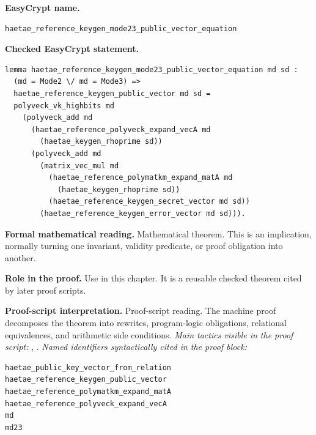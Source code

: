 \begin{formaltheorem}
\noindent\textbf{EasyCrypt name.}
\begin{lstlisting}[language=EasyCrypt,basicstyle=\ttfamily\scriptsize]
haetae_reference_keygen_mode23_public_vector_equation
\end{lstlisting}
\noindent\textbf{Checked EasyCrypt statement.}
\begin{lstlisting}[language=EasyCrypt,basicstyle=\ttfamily\scriptsize]
lemma haetae_reference_keygen_mode23_public_vector_equation md sd :
  (md = Mode2 \/ md = Mode3) =>
  haetae_reference_keygen_public_vector md sd =
  polyveck_vk_highbits md
    (polyveck_add md
      (haetae_reference_polyveck_expand_vecA md
        (haetae_keygen_rhoprime sd))
      (polyveck_add md
        (matrix_vec_mul md
          (haetae_reference_polymatkm_expand_matA md
            (haetae_keygen_rhoprime sd))
          (haetae_reference_keygen_secret_vector md sd))
        (haetae_reference_keygen_error_vector md sd))).
\end{lstlisting}
\noindent\textbf{Formal mathematical reading.}
Mathematical theorem. This is an implication, normally turning one invariant, validity predicate, or proof obligation into another.

\noindent\textbf{Role in the proof.}
Use in this chapter. It is a reusable checked theorem cited by later proof scripts.

\noindent\textbf{Proof-script interpretation.}
Proof-script reading. The machine proof decomposes the theorem into rewrites, program-logic obligations, relational equivalences, and arithmetic side conditions.
\emph{Main tactics visible in the proof script:} , .
\emph{Named identifiers syntactically cited in the proof block:}
\begin{lstlisting}[language=EasyCrypt,basicstyle=\ttfamily\scriptsize]
haetae_public_key_vector_from_relation
haetae_reference_keygen_public_vector
haetae_reference_polymatkm_expand_matA
haetae_reference_polyveck_expand_vecA
md
md23
\end{lstlisting}

\end{formaltheorem}


